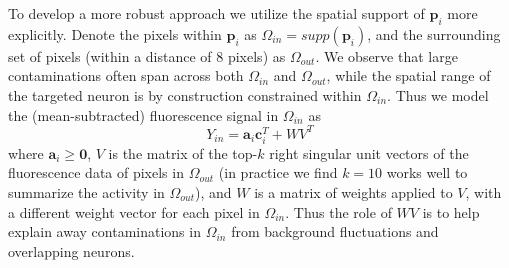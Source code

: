 \documentclass[10pt,letterpaper]{article}
\begin{document}
{%

To develop a more robust approach we utilize the spatial support of $\bm{p}_i$ more explicitly.  Denote the pixels within $\bm{p}_i$ as $\Omega_{in} = supp(\bm{p}_i)$, and the surrounding set of pixels (within a distance of 8 pixels) as $\Omega_{out}$. We observe that large contaminations often span across both $\Omega_{in}$ and $\Omega_{out}$, while the spatial range of the targeted neuron is by construction constrained within $\Omega_{in}$. Thus we model the (mean-subtracted) fluorescence signal in $\Omega_{in}$ as 
\begin{equation}
	Y_{in} = \bm{a}_i\bm{c}_i^T + WV^T \label{eq:Yin}
\end{equation}
where $\bm{a}_i\geq \bm{0}$, $V$ is the matrix of the top-$k$ right singular unit vectors of the fluorescence data of pixels in $\Omega_{out}$ (in practice we find $k=10$ works well to summarize the activity in $\Omega_{out}$), and $W$ is a matrix of weights applied to $V$, with a different weight vector for each pixel in $\Omega_{in}$.  Thus the role of $WV$ is to help explain away contaminations in $\Omega_{in}$ from background fluctuations and overlapping neurons. 


}
\end{document}
